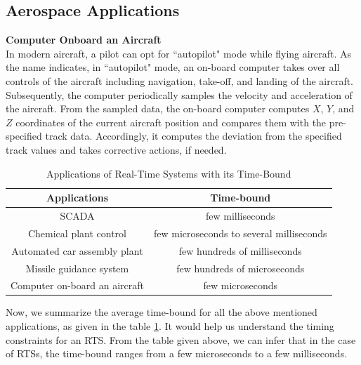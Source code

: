 \documentclass[12pt]{report}
\begin{document}
\subsection{Aerospace Applications}
\noindent\textbf{Computer Onboard an Aircraft}\\
In modern aircraft, a pilot can opt for ``autopilot" mode while flying aircraft. As the name indicates, in ``autopilot" mode, an on-board computer takes over all controls of the aircraft including navigation, take-off, and landing of the aircraft. Subsequently,  the computer periodically samples the velocity and acceleration of the aircraft. From the sampled data, the on-board computer computes $X$, $Y$, and $Z$ coordinates of the current aircraft position and compares them with the pre-specified track data. Accordingly, it computes the deviation from the specified track values and takes corrective actions, if needed. 
\begin{table}[h]
\centering
\begin{tabular}{|c|c|}
 \hline
 \textbf{Applications} & \textbf{Time-bound} \\
 \hline \hline
SCADA & few milliseconds \\ 
\hline
Chemical plant control & few microseconds to several milliseconds \\ 
 \hline
 Automated car assembly plant & few hundreds of milliseconds\\ 
 \hline
 Missile guidance system & few hundreds of microseconds\\ 
 \hline
 Computer on-board an aircraft & few microseconds \\
 \hline
\end{tabular}
\caption{Applications of Real-Time Systems with its Time-Bound}
\label{table:1}
\end{table}
Now, we summarize the average time-bound for all the above mentioned applications, as given in the table \ref{table:1}. It would help us understand the timing constraints for an RTS. From the table given above, we can infer that in the case of RTSs, the time-bound ranges from a few microseconds to a few milliseconds.
 
\end{document}

